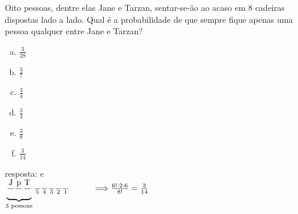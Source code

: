 \begin{ex}
 Oito pessoas, dentre elas Jane e Tarzan, sentar-se-ão ao acaso em 8 cadeiras dispostas lado a lado. Qual é a probabilidade de que sempre fique apenas uma pessoa qualquer entre Jane e Tarzan?
    \begin{enumerate}[(a)]
    \item $\frac{3}{28}$
    \item $\frac{3}{7}$
    \item $\frac{3}{4}$
    \item $\frac{3}{4}$
    \item $\frac{3}{8}$
    \item $\frac{3}{14}$
    \end{enumerate}
      \begin{sol}
      resposta: e \\
      
      $\underbrace{
      \frac{\mathrm{J}}{\phantom{A}}\frac{\mathrm{p}}{\phantom{A}}\frac{\mathrm{T}}{\phantom{A}}}_\text{3 pessoas}\frac{\phantom{A}}{5}\frac{\phantom{A}}{4}\frac{\phantom{A}}{3}\frac{\phantom{A}}{2}\frac{\phantom{A}}{1}\hspace{1.0cm}\Longrightarrow\frac{6!\cdot2\cdot6}{8!}=\frac{3}{14}$
      \end{sol}
\end{ex}